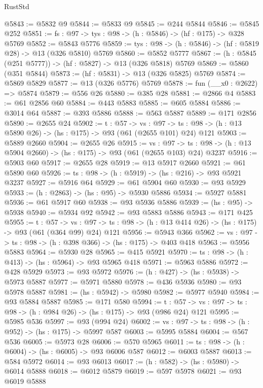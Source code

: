 \begin{lexlean}{RustStd}
\begin{coremodule}
@5843 := @5832 @9
@5844 := @5833 @9
@5845 := @244 @5844
@5846 := @5845 @252
@5851 := {fs : @97} -> {tys : @98} -> (h : @5846) -> (hf : @175) -> @328 @5769
@5852 := @5843 @5776
@5859 := {tys : @98} -> (h : @5846) -> (hf : @5819 @28) -> @13 (@326 @5810) @5769
@5860 := @5852 @5777
@5867 := (h : @5845 (@251 @5777)) -> (hf : @5827) -> @13 (@326 @5818) @5769
@5869 := @5860 (@351 @5844)
@5873 := (hf : @5831) -> @13 (@326 @5825) @5769
@5874 := @5869 @5829
@5877 := @13 (@326 @5776) @5769
@5878 := fun (__x0 : @2622) => @5874
@5879 := @556 @26
@5880 := @385 @28
@5881 := @2866 @4
@5883 := @61 @2856 @60
@5884 := @443 @5883
@5885 := @605 @5884
@5886 := @3014 @64
@5887 := @393 @5886
@5888 := @563 @5887
@5889 := @171 @2856
@5890 := @2655 @24
@5902 := {t : @57} ->
  {vs : @97} -> {ts : @98} -> (h : @13 @5890 @26) -> (hs : @175) -> @93 (@61 (@2655 @101) @24) @121
@5903 := @5889 @2660
@5904 := @2655 @26
@5915 := {vs : @97} ->
  {ts : @98} -> (h : @13 @5904 @2660) -> (hs : @175) -> @93 (@61 (@2655 @103) @24) @3237
@5916 := @5903 @60
@5917 := @2655 @28
@5919 := @13 @5917 @2660
@5921 := @61 @5890 @60
@5926 := {ts : @98} -> (h : @5919) -> (hs : @216) -> @93 @5921 @3237
@5927 := @5916 @64
@5929 := @61 @5904 @60
@5930 := @93 @5929
@5933 := (h : @2863) -> (hs : @95) -> @5930 @5886
@5934 := @5927 @5881
@5936 := @61 @5917 @60
@5938 := @93 @5936 @5886
@5939 := (hs : @95) -> @5938
@5940 := @5934 @92
@5942 := @93 @5883 @5886
@5943 := @171 @425
@5955 := {t : @57} ->
  {vs : @97} -> {ts : @98} -> (h : @13 @414 @26) -> (hs : @175) -> @93 (@61 (@364 @99) @24) @121
@5956 := @5943 @366
@5962 := {vs : @97} -> {ts : @98} -> (h : @398 @366) -> (hs : @175) -> @403 @418
@5963 := @5956 @5883
@5964 := @5930 @28
@5965 := @415 @5921
@5970 := {ts : @98} -> (h : @413) -> (hs : @5964) -> @93 @5965 @418
@5971 := @5963 @5886
@5972 := @428 @5929
@5973 := @93 @5972
@5976 := (h : @427) -> (hs : @5938) -> @5973 @5887
@5977 := @5971 @5880
@5978 := @436 @5936
@5980 := @93 @5978 @5887
@5981 := (hs : @5942) -> @5980
@5982 := @5977 @5940
@5984 := @93 @5884 @5887
@5985 := @171 @580
@5994 := {t : @57} ->
  {vs : @97} -> {ts : @98} -> (h : @984 @26) -> (hs : @175) -> @93 (@986 @24) @121
@5995 := @5985 @536
@5997 := @93 (@994 @24)
@6002 := {vs : @97} -> {ts : @98} -> (h : @952) -> (hs : @175) -> @5997 @587
@6003 := @5995 @5884
@6004 := @567 @536
@6005 := @5973 @28
@6006 := @570 @5965
@6011 := {ts : @98} -> (h : @6004) -> (hs : @6005) -> @93 @6006 @587
@6012 := @6003 @5887
@6013 := @584 @5972
@6014 := @93 @6013
@6017 := (h : @582) -> (hs : @5980) -> @6014 @5888
@6018 := @6012 @5879
@6019 := @597 @5978
@6021 := @93 @6019 @5888

\end{coremodule}
\end{lexlean}
